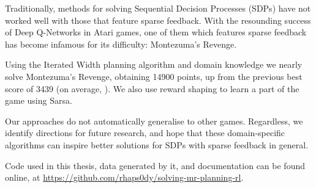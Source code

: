 Traditionally, methods for solving Sequential Decision Processes (SDPs) have not
worked well with those that feature sparse feedback. With the resounding success
of Deep Q-Networks \citep{mnih2015human} in Atari games, one of them which
features sparse feedback has become infamous for its difficulty: Montezuma's
Revenge.

Using the Iterated Width \citep{lipovetzky2015classical} planning algorithm and
domain knowledge we nearly solve Montezuma's Revenge, obtaining
14900 points, up from the previous best score of 3439 (on average,
\cite{bellemare2016unifying}). We also use reward shaping to learn a part of the
game using Sarsa.

Our approaches do not automatically generalise to other games. Regardless, we
identify directions for future research, and hope that these domain-specific
algorithms can inspire better solutions for SDPs with sparse feedback in
general.

\vspace{2cm}

Code used in this thesis, data generated by it, and documentation can be found
online, at
\href{https://github.com/rhaps0dy/solving-mr-planning-rl}{https://github.com/rhaps0dy/solving-mr-planning-rl}.